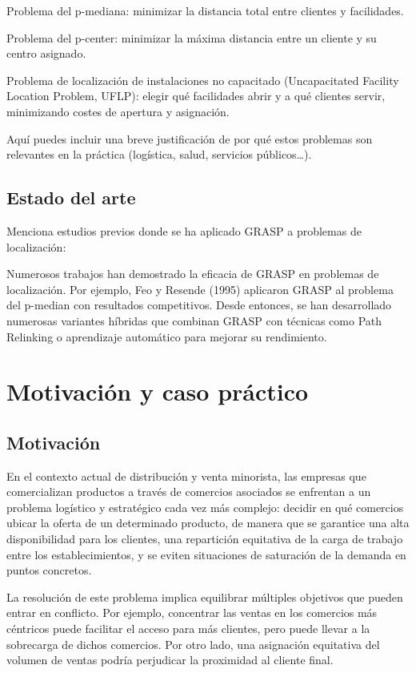 \documentclass[12pt,a4paper]{book}
\begin{document}
Problema del p-mediana: minimizar la distancia total entre clientes y facilidades.

Problema del p-center: minimizar la máxima distancia entre un cliente y su centro asignado.

Problema de localización de instalaciones no capacitado (Uncapacitated Facility Location Problem, UFLP): elegir qué facilidades abrir y a qué clientes servir, minimizando costes de apertura y asignación.

Aquí puedes incluir una breve justificación de por qué estos problemas son relevantes en la práctica (logística, salud, servicios públicos…).

\subsection{Estado del arte}

Menciona estudios previos donde se ha aplicado GRASP a problemas de localización:

Numerosos trabajos han demostrado la eficacia de GRASP en problemas de localización. 
Por ejemplo, Feo y Resende (1995) aplicaron GRASP al problema del p-median con resultados competitivos. 
Desde entonces, se han desarrollado numerosas variantes híbridas que combinan GRASP con técnicas como Path Relinking o aprendizaje automático para mejorar su rendimiento.


\section{Motivación y caso práctico}

\subsection{Motivación}

En el contexto actual de distribución y venta minorista, las empresas que comercializan productos a través de comercios asociados se enfrentan a un problema logístico y estratégico cada vez más complejo: decidir en qué comercios ubicar la oferta de un determinado producto, de manera que se garantice una alta disponibilidad para los clientes, una repartición equitativa de la carga de trabajo entre los establecimientos, y se eviten situaciones de saturación de la demanda en puntos concretos.

La resolución de este problema implica equilibrar múltiples objetivos que pueden entrar en conflicto. Por ejemplo, concentrar las ventas en los comercios más céntricos puede facilitar el acceso para más clientes, pero puede llevar a la sobrecarga de dichos comercios. Por otro lado, una asignación equitativa del volumen de ventas podría perjudicar la proximidad al cliente final.
\end{document}
